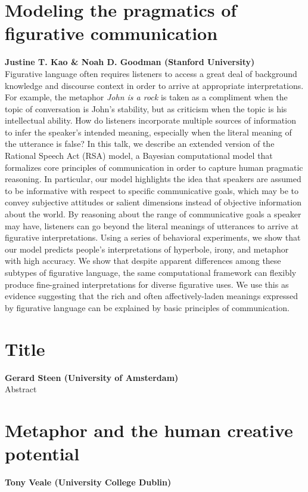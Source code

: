 \documentclass[10pt,letterpaper]{article}
\begin{document}
\section{Modeling the pragmatics of figurative communication}
\large \textbf{Justine T. Kao \& Noah D. Goodman (Stanford University)}\\
Figurative language often requires listeners to access a great deal of background knowledge and discourse context in order to arrive at appropriate interpretations. For example, the metaphor \emph{John is a rock} is taken as a compliment when the topic of conversation is John's stability, but as criticism when the topic is his intellectual ability. How do listeners incorporate multiple sources of information to infer the speaker's intended meaning, especially when the literal meaning of the utterance is false? In this talk, we describe an extended version of the Rational Speech Act (RSA) model, a Bayesian computational model that formalizes core principles of communication in order to capture human pragmatic reasoning. In particular, our model highlights the idea that speakers are assumed to be informative with respect to specific communicative goals, which may be to convey subjective attitudes or salient dimensions instead of objective information about the world. By reasoning about the range of communicative goals a speaker may have, listeners can go beyond the literal meanings of utterances to arrive at figurative interpretations. Using a series of behavioral experiments, we show that our model predicts people's interpretations of hyperbole, irony, and metaphor with high accuracy. We show that despite apparent differences among these subtypes of figurative language, the same computational framework can flexibly produce fine-grained interpretations for diverse figurative uses. We use this as evidence suggesting that the rich and often affectively-laden meanings expressed by figurative language can be explained by basic principles of communication.

\section{Title}
\large \textbf{Gerard Steen (University of Amsterdam)}\\
Abstract

\section{Metaphor and the human creative potential}
\large \textbf{Tony Veale (University College Dublin)}
\end{document}
